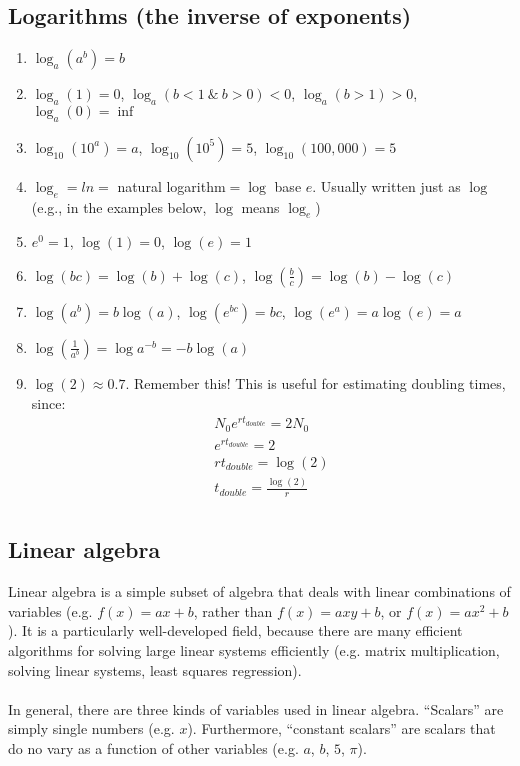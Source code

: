 \documentclass[12pt]{article}
\begin{document}
\subsection{Logarithms (the inverse of exponents)}
\begin{enumerate}
\item{} $\log_{a}(a^{b}) = b$
\item{} $\log_{a}(1) = 0$, $\log_{a}(b<1~\&~b>0) < 0$, $\log_{a}(b>1) > 0$, $\log_{a}(0) = \inf$
\item{} $\log_{10}(10^{a}) = a$, $\log_{10}(10^{5}) = 5$, $\log_{10}(100,000) = 5$
\item{} $\log_{e} = ln =$ natural logarithm$ = \log$ base $e$. Usually written just as $\log$ (e.g., in the examples below, $\log$ means $\log_{e}$)
\item{} $e^{0} = 1$, $\log(1) = 0$, $\log(e) = 1$
\item{} $\log(bc) = \log(b) + \log(c)$, $\log(\frac{b}{c})=\log(b)-\log(c)$
\item{} $\log(a^{b}) = b\log(a)$, $\log(e^{bc}) = bc$, $\log(e^{a}) = a \log(e) = a$
\item{} $\log(\frac{1}{a^{b}}) = \log{a^{-b}} = -b \log(a)$
\item{} $\log(2) \approx 0.7$. Remember this! This is useful for estimating doubling times, since:
\begin{equation}
\begin{split}
N_{0} e^{r t_{double}} = 2 N_{0}\\
e^{r t_{double}} = 2\\
r t_{double} = \log(2)\\
t_{double} = \frac{\log(2)}{r}\\
\end{split}
\end{equation}
\end{enumerate}

\subsection{Linear algebra}
Linear algebra is a simple subset of algebra that deals with linear combinations of variables (e.g. $f(x) = ax+b$, rather than $f(x) = axy+b$, or $f(x) = ax^{2} + b$). It is a particularly well-developed field, because there are many efficient algorithms for solving large linear systems efficiently (e.g. matrix multiplication, solving linear systems, least squares regression).

\paragraph{} In general, there are three kinds of variables used in linear algebra. ``Scalars'' are simply single numbers (e.g. $x$). Furthermore, ``constant scalars'' are scalars that do no vary as a function of other variables (e.g. $a$, $b$, $5$, $\pi$).
\end{document}
